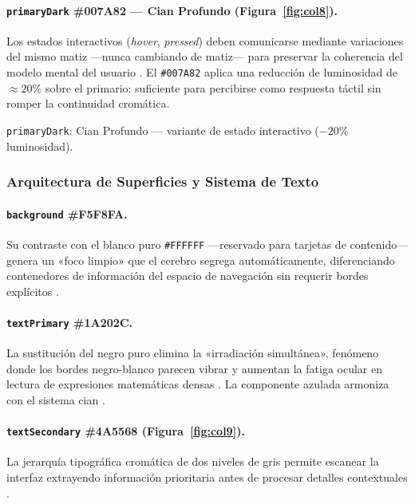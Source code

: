 \paragraph{\texorpdfstring{\texttt{primaryDark}}{primaryDark} \#007A82 — Cian Profundo (Figura~\ref{fig:col8}).}
Los estados interactivos (\emph{hover}, \emph{pressed}) deben comunicarse mediante variaciones
del mismo matiz —nunca cambiando de matiz— para preservar la coherencia del modelo mental del
usuario \cite{tidwell2020}. El \texttt{\#007A82} aplica una reducción de luminosidad de
$\approx 20\%$ sobre el primario: suficiente para percibirse como respuesta táctil sin romper
la continuidad cromática.

%
  {\texttt{primaryDark}: Cian Profundo — variante de estado interactivo ($-20\%$ luminosidad).}

\subsubsection*{Arquitectura de Superficies y Sistema de Texto}

\paragraph{\texorpdfstring{\texttt{background}}{background} \#F5F8FA.}
Su contraste con el blanco puro \texttt{\#FFFFFF} —reservado para tarjetas de contenido— genera
un «foco limpio» que el cerebro segrega automáticamente, diferenciando contenedores de información
del espacio de navegación sin requerir bordes explícitos \cite{malamed2015}.

\paragraph{\texorpdfstring{\texttt{textPrimary}}{textPrimary} \#1A202C.}
La sustitución del negro puro elimina la «irradiación simultánea», fenómeno donde los bordes
negro-blanco parecen vibrar y aumentan la fatiga ocular en lectura de expresiones matemáticas
densas \cite{heller2004}. La componente azulada armoniza con el sistema cian \cite{holtzschue2017}.

\paragraph{\texorpdfstring{\texttt{textSecondary}}{textSecondary} \#4A5568 (Figura~\ref{fig:col9}).}
La jerarquía tipográfica cromática de dos niveles de gris permite escanear la interfaz extrayendo
información prioritaria antes de procesar detalles contextuales \cite{tidwell2020}.


